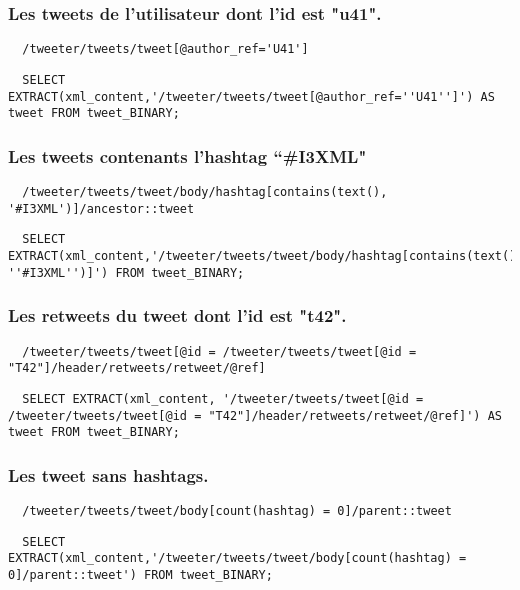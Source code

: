 \subsubsection{Les tweets de l’utilisateur dont l’id est "u41".}
\begin{verbatim}
  /tweeter/tweets/tweet[@author_ref='U41']
\end{verbatim}
\begin{verbatim}
  SELECT EXTRACT(xml_content,'/tweeter/tweets/tweet[@author_ref=''U41'']') AS tweet FROM tweet_BINARY;
\end{verbatim}

\subsubsection{Les tweets contenants l’hashtag “\#I3XML"}
\begin{verbatim}
  /tweeter/tweets/tweet/body/hashtag[contains(text(), '#I3XML')]/ancestor::tweet	
\end{verbatim}
\begin{verbatim}
  SELECT EXTRACT(xml_content,'/tweeter/tweets/tweet/body/hashtag[contains(text(), ''#I3XML'')]') FROM tweet_BINARY;
\end{verbatim}

\subsubsection{Les retweets du tweet dont l’id est "t42".}
\begin{verbatim}
  /tweeter/tweets/tweet[@id = /tweeter/tweets/tweet[@id = "T42"]/header/retweets/retweet/@ref]
\end{verbatim}
\begin{verbatim}
  SELECT EXTRACT(xml_content, '/tweeter/tweets/tweet[@id = /tweeter/tweets/tweet[@id = "T42"]/header/retweets/retweet/@ref]') AS tweet FROM tweet_BINARY;
\end{verbatim}

\subsubsection{Les tweet sans hashtags.}
\begin{verbatim}
  /tweeter/tweets/tweet/body[count(hashtag) = 0]/parent::tweet
\end{verbatim}
\begin{verbatim}
  SELECT EXTRACT(xml_content,'/tweeter/tweets/tweet/body[count(hashtag) = 0]/parent::tweet') FROM tweet_BINARY;
\end{verbatim}

